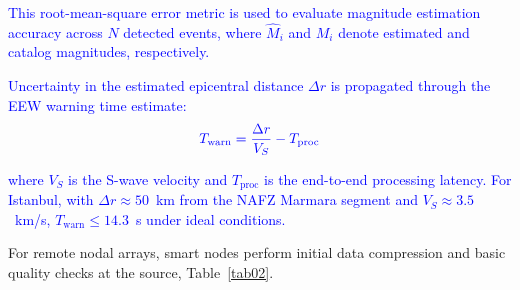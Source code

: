 \documentclass[data,article,submit,pdftex,moreauthors]{Definitions/mdpi}
\begin{document}
\textcolor{blue}{This root-mean-square error metric is used to evaluate magnitude estimation accuracy across $N$ detected events, where $\hat{M}_i$ and $M_i$ denote estimated and catalog magnitudes, respectively.}

\textcolor{blue}{Uncertainty in the estimated epicentral distance $\Delta r$ is propagated through the EEW warning time estimate:}
\begin{equation}
\textcolor{blue}{T_{\text{warn}} = \frac{\Delta r}{V_S} - T_{\text{proc}}}
\end{equation}

\textcolor{blue}{where $V_S$ is the S-wave velocity and $T_{\text{proc}}$ is the end-to-end processing latency. For Istanbul, with $\Delta r \approx 50$~km from the NAFZ Marmara segment and $V_S \approx 3.5$~km/s, $T_{\text{warn}} \leq 14.3$~s under ideal conditions.}

For remote nodal arrays, smart nodes perform initial data compression and basic quality checks at the source, Table~\ref{tab02}.
\end{document}
